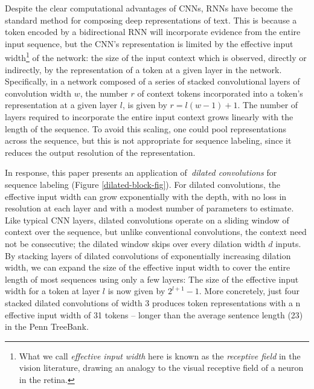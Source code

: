 Despite the clear computational advantages of CNNs, RNNs have become the standard method for composing deep representations of text. This is because a token encoded by a bidirectional RNN will incorporate evidence from the entire input sequence, but the CNN's representation is limited by the effective input width\footnote{What we call \emph{effective input width} here is known as the \emph{receptive field} in the vision literature, drawing an analogy to the visual receptive field of a neuron in the retina.} of the network: the size of the input context which is observed, directly or indirectly, by the representation of a token at a given layer in the network. Specifically, in a network composed of a series of stacked convolutional layers of convolution width $w$, the number $r$ of context tokens incorporated into a token's representation at a given layer $l$, is given by $r=l(w-1) + 1$. The number of layers required to incorporate the entire input context grows linearly with the length of the sequence. To avoid this scaling, one could pool representations across the sequence, but this is not appropriate for sequence labeling, since it reduces the output resolution of the representation.





In response, this paper presents an application of~\emph{dilated convolutions} \citep{yu2015multi} for sequence labeling (Figure \ref{dilated-block-fig}). For dilated convolutions, the effective input width can grow exponentially with the depth, with no loss in resolution at each layer and with a modest number of parameters to estimate. Like typical CNN layers, dilated convolutions operate on a sliding window of context over the sequence, but unlike conventional convolutions, the context need not be consecutive; the dilated window skips over every dilation width $d$ inputs. By stacking layers of dilated convolutions of exponentially increasing dilation width, we can expand the size of the effective input width to cover the entire length of most sequences using only a few layers: The size of the effective input width for a token at layer $l$ is now given by $2^{l+1}-1$. More concretely, just four stacked dilated convolutions of width 3 produces token representations with a n effective input width of 31 tokens -- longer than the average sentence length (23) in the Penn TreeBank. 

